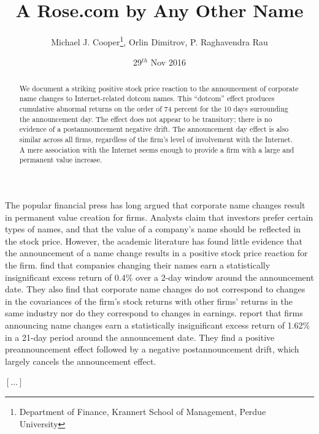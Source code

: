 \documentclass[12pt,a4paper]{article}
\title{A Rose.com by Any Other Name}
\author{Michael J. Cooper\thanks{Department of Finance, Krannert School of Management, Perdue University},
Orlin Dimitrov\footnotemark[1], P. Raghavendra Rau\footnotemark[1]}
\date{29$^{th}$ Nov 2016}
\begin{document}
\maketitle

\begin{abstract}
We document a striking positive stock price reaction to the announcement of corporate name changes to Internet-related dotcom names. This ``dotcom'' effect produces cumulative abnormal returns on the order of 74 percent for the 10 days surrounding the announcement day. The effect does not appear to be transitory; there is no evidence of a postannouncement negative drift. The announcement day effect is also similar across all firms, regardless of the firm's level of involvement with the Internet. A mere association with the Internet seems enough to provide a firm with a large and permanent value increase.
\end{abstract}
\tableofcontents
\listoftables
\listoffigures
\newpage
The popular financial press has long argued that corporate name changes result in permanent value creation for firms. Analysts claim that investors prefer certain types of names, and that the value of a company's name should be reflected in the stock price. However, the academic literature has found little evidence that the announcement of a name change results in a positive stock price reaction for the firm. \textcite{Karpoff1994} find that companies changing their names earn a statistically insignificant excess return of 0.4\% over a 2-day window around the announcement date. They also find that corporate name changes do not correspond to changes in the covariances of the firm's stock returns with other firms' returns in the same industry nor do they correspond to changes in earnings. \textcite{Bosch1989} report that firms announcing name changes earn a statistically insignificant excess return of 1.62\% in a 21-day period around the announcement date. They find a positive preannouncement effect followed by a negative postannouncement drift, which largely cancels the announcement effect.

$[\ldots]$
\end{document}
